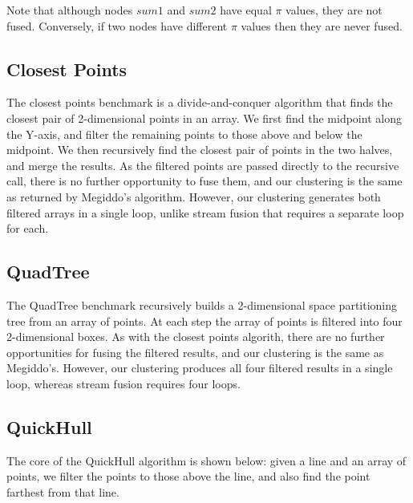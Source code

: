 Note that although nodes $sum1$ and $sum2$ have equal $\pi$ values, they are not fused. Conversely, if two nodes have different $\pi$ values then they are never fused. 



\subsection{Closest Points}
The closest points benchmark is a divide-and-conquer algorithm that finds the closest pair of 2-dimensional points in an array. We first find the midpoint along the Y-axis, and filter the remaining points to those above and below the midpoint. We then recursively find the closest pair of points in the two halves, and merge the results. As the filtered points are passed directly to the recursive call, there is no further opportunity to fuse them, and our clustering is the same as returned by Megiddo's algorithm. However, our clustering generates both filtered arrays in a single loop, unlike stream fusion that requires a separate loop for each.


\subsection{QuadTree}
The QuadTree benchmark recursively builds a 2-dimensional space partitioning tree from an array of points. At each step the array of points is filtered into four 2-dimensional boxes. As with the closest points algorith, there are no further opportunities for fusing the filtered results, and our clustering is the same as Megiddo's. However, our clustering produces all four filtered results in a single loop, whereas stream fusion requires four loops.


\subsection{QuickHull}
The core of the QuickHull algorithm is shown below: given a line and an array of points, we filter the points to those above the line, and also find the point farthest from that line.

